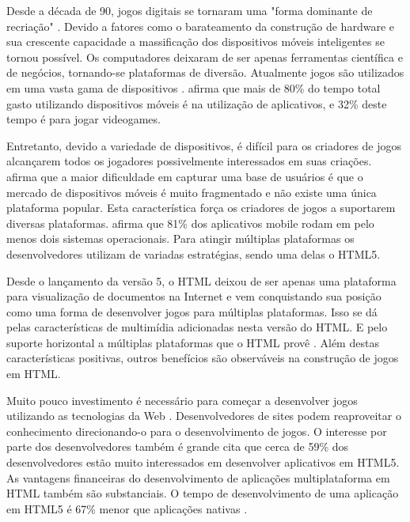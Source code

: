 \setcounter{page}{10}

Desde a década de 90, jogos digitais se tornaram uma "forma dominante
de recriação" \autocite{gameDesignPatterns}. Devido a fatores
como o barateamento da construção de hardware e sua crescente
capacidade a massificação dos dispositivos móveis inteligentes
se tornou possível. Os computadores deixaram de ser apenas
ferramentas científica e de negócios, tornando-se plataformas de
diversão. Atualmente jogos são utilizados em uma vasta gama de
dispositivos \citet[p. 6]{crossPlatformMobileGameDevelopment}.
\citet{HTML5CrossPlatformGameDevelopment} afirma que mais de 80\% do
tempo total gasto utilizando dispositivos móveis é na utilização de
aplicativos, e 32\% deste tempo é para jogar videogames.

Entretanto, devido a variedade de dispositivos, é difícil para
os criadores de jogos alcançarem todos os jogadores possivelmente
interessados em suas criações. \citet{html5Tradeoffs} afirma que a
maior dificuldade em capturar uma base de usuários é que o mercado
de dispositivos móveis é muito fragmentado e não existe uma única
plataforma popular. Esta característica força os criadores de jogos a
suportarem diversas plataformas. \citet{htmlSurvey} afirma que 81\% dos
aplicativos mobile rodam em pelo menos dois sistemas operacionais. Para
atingir múltiplas plataformas os desenvolvedores utilizam de variadas
estratégias, sendo uma delas o HTML5.

Desde o lançamento da versão 5, o HTML deixou de ser apenas uma
plataforma para visualização de documentos na Internet e vem
conquistando sua posição como uma forma de desenvolver jogos
para múltiplas plataformas. Isso se dá pelas características de
multimídia adicionadas nesta versão do HTML. E pelo suporte horizontal
a múltiplas plataformas que o HTML provê \autocite{html5Tradeoffs}.
Além destas características positivas, outros benefícios são
observáveis na construção de jogos em HTML.

Muito pouco investimento é necessário para começar a desenvolver
jogos utilizando as tecnologias da Web \autocite{html5mostwanted}.
Desenvolvedores de sites podem reaproveitar o conhecimento
direcionando-o para o desenvolvimento de jogos. O interesse por
parte dos desenvolvedores também é grande \autocite{htmlSurvey}
cita que cerca de 59\% dos desenvolvedores estão muito interessados
em desenvolver aplicativos em HTML5. As vantagens financeiras do
desenvolvimento de aplicações multiplataforma em HTML também são
substanciais. O tempo de desenvolvimento de uma aplicação em HTML5 é
67\% menor que aplicações nativas \autocite[p. 460]{html5Tradeoffs}.

